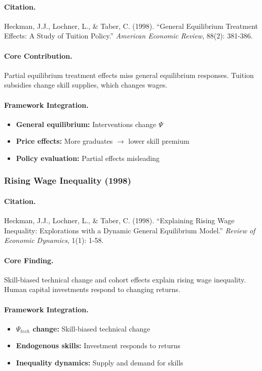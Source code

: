 \paragraph{Citation.}
Heckman, J.J., Lochner, L., \& Taber, C. (1998). ``General Equilibrium
Treatment Effects: A Study of Tuition Policy.''
\emph{American Economic Review}, 88(2): 381-386.

\paragraph{Core Contribution.}
Partial equilibrium treatment effects miss general equilibrium responses.
Tuition subsidies change skill supplies, which changes wages.

\paragraph{Framework Integration.}
\begin{itemize}
  \item \textbf{General equilibrium:} Interventions change $\Psi$
  \item \textbf{Price effects:} More graduates $\to$ lower skill premium
  \item \textbf{Policy evaluation:} Partial effects misleading
\end{itemize}

\subsubsection{Rising Wage Inequality (1998)}

\paragraph{Citation.}
Heckman, J.J., Lochner, L., \& Taber, C. (1998). ``Explaining Rising
Wage Inequality: Explorations with a Dynamic General Equilibrium Model.''
\emph{Review of Economic Dynamics}, 1(1): 1-58.

\paragraph{Core Finding.}
Skill-biased technical change and cohort effects explain rising
wage inequality. Human capital investments respond to changing returns.

\paragraph{Framework Integration.}
\begin{itemize}
  \item \textbf{$\Psi_{tech}$ change:} Skill-biased technical change
  \item \textbf{Endogenous skills:} Investment responds to returns
  \item \textbf{Inequality dynamics:} Supply and demand for skills
\end{itemize}

